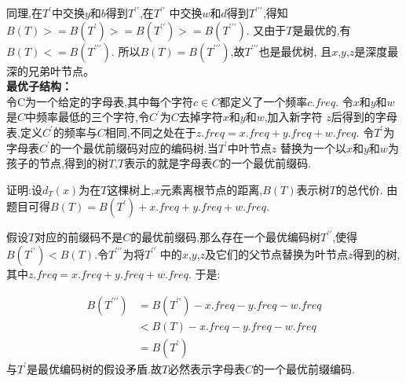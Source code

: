 \documentclass[UTF8]{ctexart}
\begin{document}
同理,在$T^\prime$中交换$y$和$b$得到$T^{\prime \prime}$,在$T^{\prime \prime}$
中交换$w$和$d$得到$T^{\prime \prime \prime}$,得知$B(T)>=B(T^{\prime})>=B(T^{\prime \prime})>=B(T^{\prime \prime \prime})$.
又由于$T$是最优的,有$B(T)<=B(T^{\prime \prime \prime})$.
所以$B(T)=B(T^{\prime \prime \prime})$,故$T^{\prime \prime \prime}$也是最优树,
且$x$,$y$,$z$是深度最深的兄弟叶节点。\\

\textbf{最优子结构：}\\
令C为一个给定的字母表,其中每个字符$c\in C$都定义了一个频率$c.freq$.
令$x$和$y$和$w$是$C$中频率最低的三个字符,令$C^\prime$为$C$去掉字符$x$和$y$和$w$,加入新字符
$z$后得到的字母表,定义$C^\prime$的频率与$C$相同,不同之处在于$z.freq=x.freq+y.freq+w.freq$.
令$T^\prime$为字母表$C^\prime$的一个最优前缀码对应的编码树.当$T^\prime$中叶节点$z$
替换为一个以$x$和$y$和$w$为孩子的节点,得到的树$T$,$T$表示的就是字母表$C$的一个最优前缀码.

证明:设$d_T(x)$为在$T$这棵树上,$x$元素离根节点的距离,$B(T)$表示树$T$的总代价.
由题目可得$B(T)=B(T^\prime)+x.freq+y.freq+w.freq$.

假设$T$对应的前缀码不是$C$的最优前缀码,那么存在一个最优编码树$T^{\prime \prime}$,使得
$B(T^{\prime\prime})<B(T)$.令$T^{\prime \prime \prime}$为将$T^{\prime \prime}$
中的$x$,$y$,$z$及它们的父节点替换为叶节点$z$得到的树,其中$z.freq=x.freq+y.freq+w.freq$.
于是:

\begin{equation*}
	\begin{aligned}
        B(T^{\prime \prime \prime}) &= B(T^{\prime \prime}) - x.freq-y.freq-w.freq \\
                                    &<B(T)-x.freq-y.freq-w.freq \\
                                    &=B(T^{\prime})
	\end{aligned}
\end{equation*}
与$T^{\prime}$是最优编码树的假设矛盾.故$T$必然表示字母表$C$的一个最优前缀编码.
\end{document}
